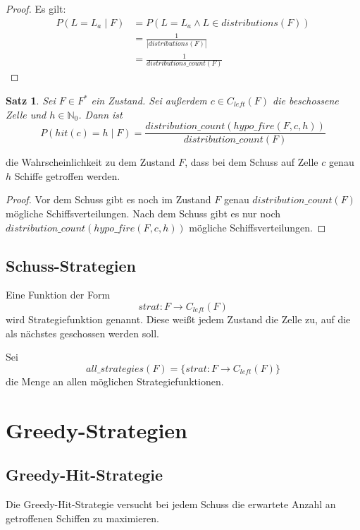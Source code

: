 \documentclass[a4paper,12pt]{llncs}
\newcommand{\N}{{\mathbb{N}}}
\numberwithin{equation}{section}
\newtheorem{satz}{Satz}
\begin{document}
\begin{proof}
Es gilt:
\begin{align}
P(L=L_a\mid F) &= P(L=L_a \land L\in distributions(F))\nonumber\\ &= \frac{1}{\left|distributions(F)\right|} \nonumber\\ &= \frac{1}{distributions\_count(F)}\nonumber
\end{align}
\end{proof}


\begin{satz}
Sei $F\in F^*$ ein Zustand.
Sei außerdem $c \in C_{left}(F)$ die beschossene Zelle und $h \in \N_0$.
Dann ist
\[
P(hit(c)=h \mid F)=\frac{distribution\_count(hypo\_fire(F,c, h))}{distribution\_count(F)}
\]
\end{satz}
die Wahrscheinlichkeit zu dem Zustand $F$, dass bei dem Schuss auf Zelle $c$ genau $h$ Schiffe getroffen werden.

\begin{proof}
Vor dem Schuss gibt es noch im Zustand $F$ genau $distribution\_count(F)$ mögliche Schiffsverteilungen.
Nach dem Schuss gibt es nur noch \\$distribution\_count(hypo\_fire(F,c, h))$ mögliche Schiffsverteilungen.
\end{proof}


\subsection{Schuss-Strategien}

\begin{definition}
Eine Funktion der Form
\[
strat \colon F \rightarrow C_{left}(F)
\]
wird Strategiefunktion genannt. Diese weißt jedem Zustand die Zelle zu, auf die als nächstes geschossen werden soll.
\end{definition}

\begin{definition}
Sei
\[
all\_strategies(F)=\{ strat \colon F \rightarrow C_{left}(F) \}
\]
die Menge an allen möglichen Strategiefunktionen.
\end{definition}

\section{Greedy-Strategien}

\subsection{Greedy-Hit-Strategie}
Die Greedy-Hit-Strategie versucht bei jedem Schuss die erwartete Anzahl an getroffenen Schiffen zu maximieren.
\end{document}
